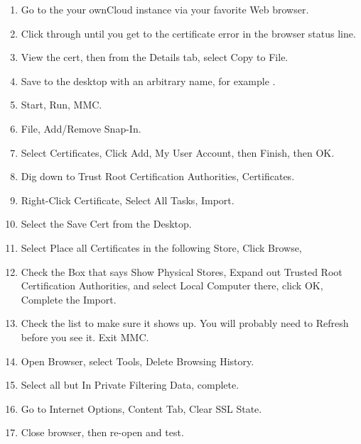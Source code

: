 \documentclass[letterpaper,10pt,english]{sphinxmanual}
\begin{document}
\label{files/access_webdav:id9}\begin{enumerate}
\item {} 
Go to the your ownCloud instance via your favorite Web browser.

\item {} 
Click through until you get to the certificate error in the browser status
line.

\item {} 
View the cert, then from the Details tab, select Copy to File.

\item {} 
Save to the desktop with an arbitrary name, for example .

\item {} 
Start, Run, MMC.

\item {} 
File, Add/Remove Snap-In.

\item {} 
Select Certificates, Click Add, My User Account, then Finish, then OK.

\item {} 
Dig down to Trust Root Certification Authorities, Certificates.

\item {} 
Right-Click Certificate, Select All Tasks, Import.

\item {} 
Select the Save Cert from the Desktop.

\item {} 
Select Place all Certificates in the following Store, Click Browse,

\item {} 
Check the Box that says Show Physical Stores, Expand out Trusted Root
Certification Authorities, and select Local Computer there, click OK,
Complete the Import.

\item {} 
Check the list to make sure it shows up. You will probably need to Refresh
before you see it. Exit MMC.

\item {} 
Open Browser, select Tools, Delete Browsing History.

\item {} 
Select all but In Private Filtering Data, complete.

\item {} 
Go to Internet Options, Content Tab, Clear SSL State.

\item {} 
Close browser, then re-open and test.

\end{enumerate}
\end{document}
